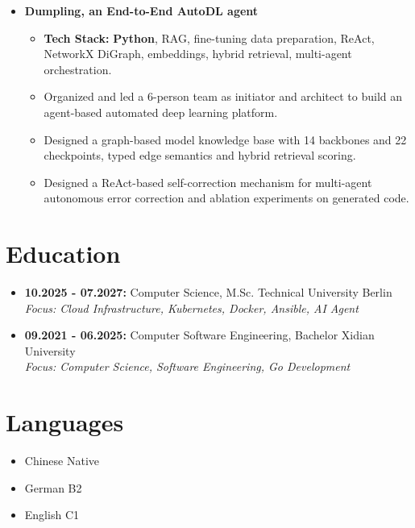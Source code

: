 \documentclass[10pt,a4paper]{article}
\newcommand{\cvright}[1]{\hfill{\normalfont #1}}
\newcommand{\cvedu}[4]{%
  \item \textbf{#1:} #2 \cvright{#3}\\
  \textit{Focus: #4}
}
\begin{document}
\begin{itemize}
  \item \textbf{Dumpling, an End-to-End AutoDL agent}
    \begin{itemize}
      \item \textbf{Tech Stack:} \textbf{Python}, RAG, fine-tuning data preparation, ReAct, NetworkX DiGraph, embeddings, hybrid retrieval, multi-agent orchestration.
      \item Organized and led a 6-person team as initiator and architect to build an agent-based automated deep learning platform.
      \item Designed a graph-based model knowledge base with 14 backbones and 22 checkpoints, typed edge semantics and hybrid retrieval scoring.
      \item Designed a ReAct-based self-correction mechanism for multi-agent autonomous error correction and ablation experiments on generated code.
    \end{itemize}
\end{itemize}

\section*{Education}
\begin{itemize}
  \cvedu{10.2025 - 07.2027}{Computer Science, M.Sc.}{Technical University Berlin}{Cloud Infrastructure, Kubernetes, Docker, Ansible, AI Agent}
  \cvedu{09.2021 - 06.2025}{Computer Software Engineering, Bachelor}{Xidian University}{Computer Science, Software Engineering, Go Development}
\end{itemize}

\section*{Languages}
\begin{itemize}
  \item Chinese \cvright{Native}
  \item German \cvright{B2}
  \item English \cvright{C1}
\end{itemize}
\end{document}
